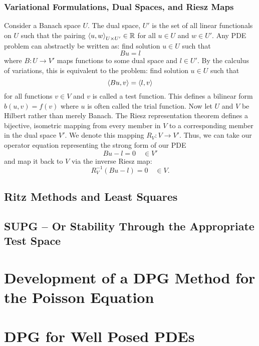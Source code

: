 \documentclass{article}
\begin{document}
\subsubsection{Variational Formulations, Dual Spaces, and Riesz Maps}
Consider a Banach space $U$. The dual space, $U'$ is the set of all linear functionals on $U$ such that the pairing $\left\langle u,w \right\rangle_{U\times U'}\in\mathbb{R}$ 
for all $u\in U$ and $w\in U'$.
Any PDE problem can abstractly be written as: find solution $u\in U$ such that
\[
Bu=l
\]
where $B:U\rightarrow V'$ maps functions to some dual space and $l\in U'$.
By the calculus of variations, this is equivalent to the problem: find solution $u\in U$ such that
\[
\left\langle Bu,v \right\rangle=\left\langle l,v \right\rangle
\]
for all functions $v\in V$ and $v$ is called a test function.
This defines a bilinear form $b(u,v)=f(v)$ where $u$ is often called the trial function.
Now let $U$ and $V$ be Hilbert rather than merely Banach.
The Riesz representation theorem defines a bijective, isometric mapping from every member in $V$ to a corresponding member in the dual space $V'$.
We denote this mapping $R_V:V\rightarrow V'$.
Thus, we can take our operator equation representing the strong form of our PDE
\[
Bu-l=0\quad\in V'
\]
and map it back to $V$ via the inverse Riesz map:
\[
R_V^{-1}(Bu-l)=0\quad\in V.
\]


\subsection{Ritz Methods and Least Squares}

\subsection{SUPG -- Or Stability Through the Appropriate Test Space}

\section{Development of a DPG Method for the Poisson Equation}

\section{DPG for Well Posed PDEs}
\end{document}
